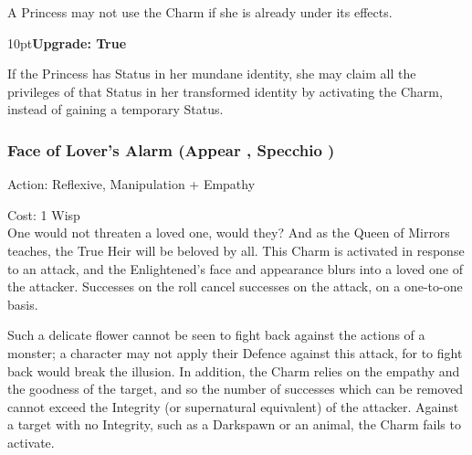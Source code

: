 \noindent A Princess may not use the Charm if she is already under its effects. \\


\begin{myindentpar}{10pt}\textbf{Upgrade: True}

If the Princess has Status in her mundane identity, she may claim all the privileges of that Status in her transformed identity by activating the Charm, instead of gaining a temporary Status.\end{myindentpar}

\subsubsection*{Face of Lover's Alarm (Appear \textbullet, Specchio \textbullet\textbullet)}

\noindent Action: Reflexive, Manipulation + Empathy

\noindent Cost: 1 Wisp\\

\noindent One would not threaten a loved one, would they? And as the Queen of Mirrors teaches, the True Heir will be beloved by all. This Charm is activated in response to an attack, and the Enlightened's face and appearance blurs into a loved one of the attacker. Successes on the roll cancel successes on the attack, on a one-to-one basis.

Such a delicate flower cannot be seen to fight back against the actions of a monster; a character may not apply their Defence against this attack, for to fight back would break the illusion. In addition, the Charm relies on the empathy and the goodness of the target, and so the number of successes which can be removed cannot exceed the Integrity (or supernatural equivalent) of the attacker. Against a target with no Integrity, such as a Darkspawn or an animal, the Charm fails to activate.

